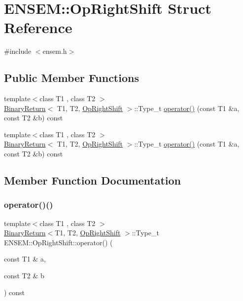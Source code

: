 \hypertarget{structENSEM_1_1OpRightShift}{}\section{E\+N\+S\+EM\+:\+:Op\+Right\+Shift Struct Reference}
\label{structENSEM_1_1OpRightShift}


{\ttfamily \#include $<$ensem.\+h$>$}

\subsection*{Public Member Functions}
\begin{DoxyCompactItemize}
\item 
{\footnotesize template$<$class T1 , class T2 $>$ }\\\mbox{\hyperlink{structENSEM_1_1BinaryReturn}{Binary\+Return}}$<$ T1, T2, \mbox{\hyperlink{structENSEM_1_1OpRightShift}{Op\+Right\+Shift}} $>$\+::Type\+\_\+t \mbox{\hyperlink{structENSEM_1_1OpRightShift_a8cfd6827272b2d7eda3b0912d67e4967}{operator()}} (const T1 \&a, const T2 \&b) const
\item 
{\footnotesize template$<$class T1 , class T2 $>$ }\\\mbox{\hyperlink{structENSEM_1_1BinaryReturn}{Binary\+Return}}$<$ T1, T2, \mbox{\hyperlink{structENSEM_1_1OpRightShift}{Op\+Right\+Shift}} $>$\+::Type\+\_\+t \mbox{\hyperlink{structENSEM_1_1OpRightShift_a8cfd6827272b2d7eda3b0912d67e4967}{operator()}} (const T1 \&a, const T2 \&b) const
\end{DoxyCompactItemize}


\subsection{Member Function Documentation}
\mbox{\label{structENSEM_1_1OpRightShift_a8cfd6827272b2d7eda3b0912d67e4967}} 
\subsubsection{\texorpdfstring{operator()()}{operator()()}\hspace{0.1cm}{\footnotesize\ttfamily [1/2]}}
{\footnotesize\ttfamily template$<$class T1 , class T2 $>$ \\
\mbox{\hyperlink{structENSEM_1_1BinaryReturn}{Binary\+Return}}$<$T1, T2, \mbox{\hyperlink{structENSEM_1_1OpRightShift}{Op\+Right\+Shift}} $>$\+::Type\+\_\+t E\+N\+S\+E\+M\+::\+Op\+Right\+Shift\+::operator() (\begin{DoxyParamCaption}\item[{const T1 \&}]{a,  }\item[{const T2 \&}]{b }\end{DoxyParamCaption}) const\hspace{0.3cm}{\ttfamily [inline]}}

